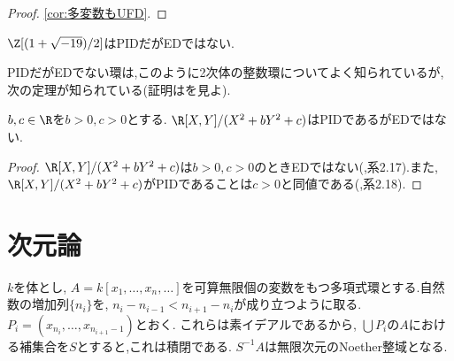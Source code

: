 \begin{proof}
	\ref{cor:多変数もUFD}.
\end{proof}
\begin{surex}[PIDだがEDでない環]
	$\Z[(1+\sqrt{-19})/2]$はPIDだがEDではない.
\end{surex}

PIDだがEDでない環は,このように2次体の整数環についてよく知られているが,次の定理が知られている(証明は\cite{goel2018nullstellenstze}を見よ).

\begin{thm}
	$b,c\in\R$を$b>0,c>0$とする. $\R[X,Y]/(X^2+bY^2+c)$はPIDであるがEDではない.
\end{thm}

\begin{proof}
	$\R[X,Y]/(X^2+bY^2+c)$は$b>0,c>0$のときEDではない(\cite{goel2018nullstellenstze},系2.17).また, $\R[X,Y]/(X^2+bY^2+c)$がPIDであることは$c>0$と同値である(\cite{goel2018nullstellenstze},系2.18).
\end{proof}

\section{次元論}
\begin{surex}\label{ex:無限次元Noether環}
	$k$を体とし, $A=k[x_1,\dots,x_n,\dots]$を可算無限個の変数をもつ多項式環とする.自然数の増加列$\{n_i\}$を, $n_i-n_{i-1}<n_{i+1}-n_i$が成り立つように取る. $P_i=(x_{n_i},\dots, x_{n_{i+1}-1})$とおく. これらは素イデアルであるから, $\bigcup P_i$の$A$における補集合を$S$とすると,これは積閉である. $S^{-1}A$は無限次元のNoether整域となる.
\end{surex}

